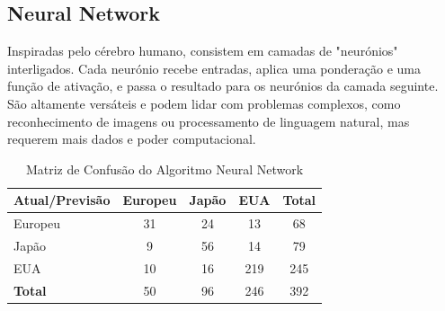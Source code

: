 \documentclass[conference]{IEEEtran}
\begin{document}
\subsection{Neural Network}
Inspiradas pelo cérebro humano, consistem em camadas de "neurónios" interligados. Cada neurónio recebe entradas,
aplica uma ponderação e uma função de ativação, e passa o resultado para os neurónios da camada seguinte. São altamente versáteis
e podem lidar com problemas complexos, como reconhecimento de imagens ou processamento de linguagem natural, mas requerem mais dados
e poder computacional.
\begin{table}[!ht]
	\centering
	\begin{tabular}{lcccc}
		\toprule
		\textbf{Atual/Previsão} & \textbf{Europeu} & \textbf{Japão} & \textbf{EUA} & \textbf{Total} \\
		\midrule
		Europeu                 & 31               & 24             & 13           & 68             \\
		Japão                   & 9                & 56             & 14           & 79             \\
		EUA                     & 10               & 16             & 219          & 245            \\
		\midrule
		\textbf{Total}          & 50               & 96             & 246          & 392            \\
		\bottomrule
	\end{tabular}
	\label{tab:conf_matrix_neural}
	\caption{Matriz de Confusão do Algoritmo Neural Network}
\end{table}

\end{document}
